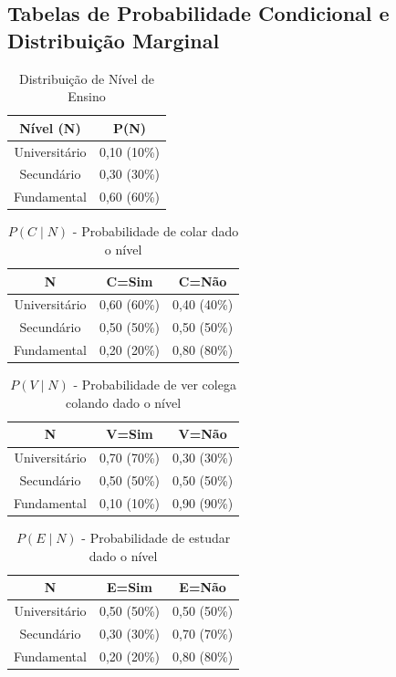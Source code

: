 \documentclass[a4paper,12pt]{article}
\begin{document}
\subsection{Tabelas de Probabilidade Condicional e Distribuição Marginal}


\begin{table}[H]
\centering
\begin{tabular}{|c|c|}
\hline
\textbf{Nível (N)} & \textbf{P(N)} \\
\hline
Universitário & 0,10 (10\%) \\
Secundário & 0,30 (30\%) \\
Fundamental & 0,60 (60\%) \\
\hline
\end{tabular}
\caption{Distribuição de Nível de Ensino}
\end{table}


\begin{table}[H]
\centering
\begin{tabular}{|c|c|c|}
\hline
\textbf{N} & \textbf{C=Sim} & \textbf{C=Não} \\
\hline
Universitário & 0,60 (60\%) & 0,40 (40\%) \\
Secundário & 0,50 (50\%) & 0,50 (50\%) \\
Fundamental & 0,20 (20\%) & 0,80 (80\%) \\
\hline
\end{tabular}
\caption{$P(C \mid N)$ - Probabilidade de colar dado o nível}
\end{table}

\begin{table}[H]
\centering
\begin{tabular}{|c|c|c|}
\hline
\textbf{N} & \textbf{V=Sim} & \textbf{V=Não} \\
\hline
Universitário & 0,70 (70\%) & 0,30 (30\%) \\
Secundário & 0,50 (50\%) & 0,50 (50\%) \\
Fundamental & 0,10 (10\%) & 0,90 (90\%) \\
\hline
\end{tabular}
\caption{$P(V \mid N)$ - Probabilidade de ver colega colando dado o nível}
\end{table}

\begin{table}[H]
\centering
\begin{tabular}{|c|c|c|}
\hline
\textbf{N} & \textbf{E=Sim} & \textbf{E=Não} \\
\hline
Universitário & 0,50 (50\%) & 0,50 (50\%) \\
Secundário & 0,30 (30\%) & 0,70 (70\%) \\
Fundamental & 0,20 (20\%) & 0,80 (80\%) \\
\hline
\end{tabular}
\caption{$P(E \mid N)$ - Probabilidade de estudar dado o nível}
\end{table}
\end{document}
